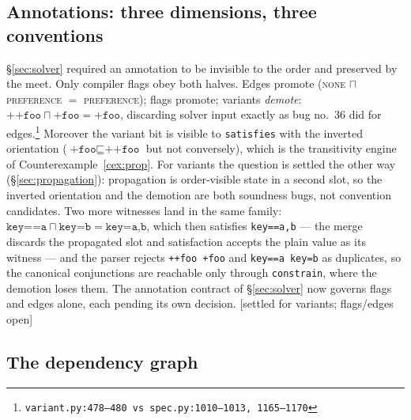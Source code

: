 \documentclass[11pt]{article}
\theoremstyle{definition}
\theoremstyle{remark}
\newcommand{\sat}{\sqsubseteq}
\newcommand{\meet}{\sqcap}
\newcommand{\code}[1]{\texttt{#1}}
\newcommand{\src}[1]{\footnote{\code{#1}}}
\begin{document}
\subsection{Annotations: three dimensions, three conventions}

\S\ref{sec:solver} required an annotation to be invisible to the order and
preserved by the meet.  Only compiler flags obey both halves.  Edges promote
(\textsc{none} $\meet$ \textsc{preference} $=$ \textsc{preference}); flags
promote; variants \emph{demote}: $\code{++foo} \meet \code{+foo} =
\code{+foo}$, discarding solver input exactly as bug no.~36 did for
edges.\src{variant.py:478--480 vs spec.py:1010--1013, 1165--1170}  Moreover
the variant bit is visible to \code{satisfies} with the inverted orientation
($\code{+foo} \sat \code{++foo}$ but not conversely), which is the
transitivity engine of Counterexample~\ref{cex:prop}.  For variants the
question is settled the other way (\S\ref{sec:propagation}): propagation is
order-visible state in a second slot, so the inverted orientation and the
demotion are both soundness bugs, not convention candidates.  Two more
witnesses land in the same family: $\code{key==a} \meet \code{key=b} =
\code{key=a,b}$, which then satisfies \code{key==a,b} --- the merge
discards the propagated slot and satisfaction accepts the plain value as
its witness --- and the parser rejects \code{++foo +foo} and
\code{key==a key=b} as duplicates, so the canonical conjunctions are
reachable only through \code{constrain}, where the demotion loses them.
The annotation contract of \S\ref{sec:solver} now governs flags and edges
alone, each pending its own decision.  [settled for variants; flags/edges
open]

\subsection{The dependency graph}\label{sec:audit-graph}
\end{document}
